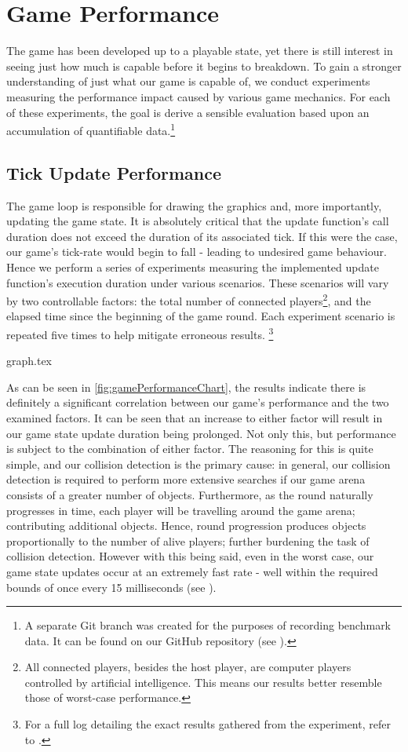 \documentclass{standalone}
\begin{document}
	\section{Game Performance}
		The game has been developed up to a playable state, yet there is still interest in seeing just how much is capable before it begins to breakdown. To gain a stronger understanding of just what our game is capable of, we conduct experiments measuring the performance impact caused by various game mechanics. For each of these experiments, the goal is derive a sensible evaluation based upon an accumulation of quantifiable data.\footnote{A separate Git branch was created for the purposes of recording benchmark data. It can be found on our GitHub repository (see ).}

		\subsection{Tick Update Performance} \label{sec:tickUpdatePerformance}
			The game loop is responsible for drawing the graphics and, more importantly, updating the game state. It is absolutely critical that the update function's call duration does not exceed the duration of its associated tick. If this were the case, our game's tick-rate would begin to fall - leading to undesired game behaviour. Hence we perform a series of experiments measuring the implemented update function's execution duration under various scenarios. These scenarios will vary by two controllable factors: the total number of connected players\footnote{All connected players, besides the host player, are computer players controlled by artificial intelligence. This means our results better resemble those of worst-case performance.}, and the elapsed time since the beginning of the game round. Each experiment scenario is repeated five times to help mitigate erroneous results. \footnote{For a full log detailing the exact results gathered from the experiment, refer to .}

			{graph.tex}

			As can be seen in \autoref{fig:gamePerformanceChart}, the results indicate there is definitely a significant correlation between our game's performance and the two examined factors. It can be seen that an increase to either factor will result in our game state update duration being prolonged. Not only this, but performance is subject to the combination of either factor. The reasoning for this is quite simple, and our collision detection is the primary cause: in general, our collision detection is required to perform more extensive searches if our game arena consists of a greater number of objects. Furthermore, as the round naturally progresses in time, each player will be travelling around the game arena; contributing additional objects. Hence, round progression produces objects proportionally to the number of alive players; further burdening the task of collision detection. However with this being said, even in the worst case, our game state updates occur at an extremely fast rate - well within the required bounds of once every 15 milliseconds (see ).
\end{document}
